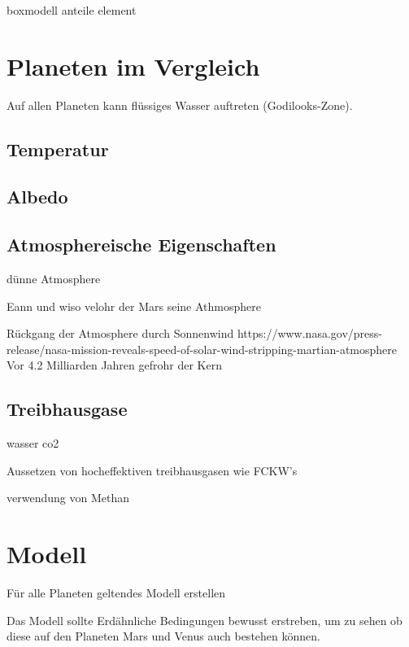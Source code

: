 \begin{refsection}
boxmodell anteile element



\section{Planeten im Vergleich}


Auf allen Planeten kann flüssiges Wasser auftreten (Godilooks-Zone).


\subsection{Temperatur}

\subsection{Albedo}

\subsection{Atmosphereische Eigenschaften}

dünne Atmosphere

Eann und wiso velohr der Mars seine Athmosphere


Rückgang der Atmosphere durch Sonnenwind
	https://www.nasa.gov/press-release/nasa-mission-reveals-speed-of-solar-wind-stripping-martian-atmosphere
	Vor 4.2 Milliarden Jahren gefrohr der Kern


\subsection{Treibhausgase}

wasser co2



Aussetzen von hocheffektiven treibhausgasen wie FCKW's

verwendung von Methan 




\section{Modell}


	Für alle Planeten geltendes Modell erstellen
	
	Das Modell sollte Erdähnliche Bedingungen bewusst erstreben, um zu sehen ob diese auf den Planeten Mars und Venus auch bestehen können.
	

\end{refsection}
